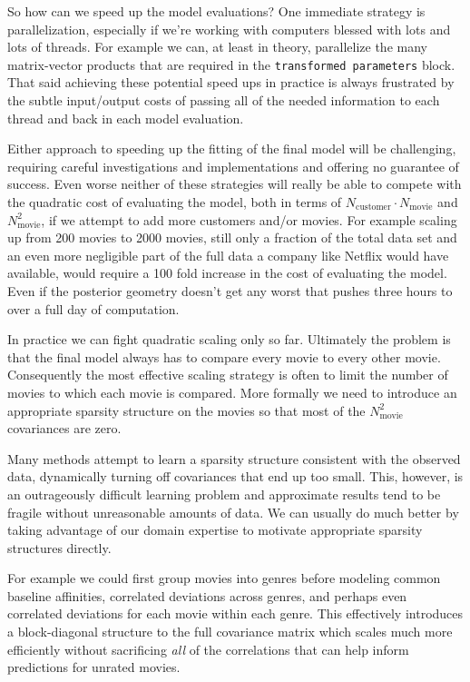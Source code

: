 \documentclass[
  letterpaper,
  DIV=11,
  numbers=noendperiod]{scrartcl}
\begin{document}
So how can we speed up the model evaluations? One immediate strategy is
parallelization, especially if we're working with computers blessed with
lots and lots of threads. For example we can, at least in theory,
parallelize the many matrix-vector products that are required in the
\texttt{transformed\ parameters} block. That said achieving these
potential speed ups in practice is always frustrated by the subtle
input/output costs of passing all of the needed information to each
thread and back in each model evaluation.

Either approach to speeding up the fitting of the final model will be
challenging, requiring careful investigations and implementations and
offering no guarantee of success. Even worse neither of these strategies
will really be able to compete with the quadratic cost of evaluating the
model, both in terms of \(N_{\text{customer}} \cdot N_{\text{movie}}\)
and \(N_{\text{movie}}^{2}\), if we attempt to add more customers and/or
movies. For example scaling up from 200 movies to 2000 movies, still
only a fraction of the total data set and an even more negligible part
of the full data a company like Netflix would have available, would
require a 100 fold increase in the cost of evaluating the model. Even if
the posterior geometry doesn't get any worst that pushes three hours to
over a full day of computation.

In practice we can fight quadratic scaling only so far. Ultimately the
problem is that the final model always has to compare every movie to
every other movie. Consequently the most effective scaling strategy is
often to limit the number of movies to which each movie is compared.
More formally we need to introduce an appropriate sparsity structure on
the movies so that most of the \(N_{\text{movie}}^{2}\) covariances are
zero.

Many methods attempt to learn a sparsity structure consistent with the
observed data, dynamically turning off covariances that end up too
small. This, however, is an outrageously difficult learning problem and
approximate results tend to be fragile without unreasonable amounts of
data. We can usually do much better by taking advantage of our domain
expertise to motivate appropriate sparsity structures directly.

For example we could first group movies into genres before modeling
common baseline affinities, correlated deviations across genres, and
perhaps even correlated deviations for each movie within each genre.
This effectively introduces a block-diagonal structure to the full
covariance matrix which scales much more efficiently without sacrificing
\emph{all} of the correlations that can help inform predictions for
unrated movies.
\end{document}
